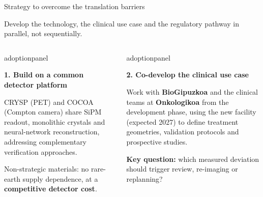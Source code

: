 \documentclass[aspectratio=169,11pt]{beamer}
\newcommand{\hi}[1]{\textcolor{crRed}{#1}}
\begin{document}
\begin{frame}{Strategy to overcome the translation barriers}

{\small Develop the technology, the clinical use case and the regulatory pathway \hi{in parallel}, not sequentially.\par}
\vspace{0.16cm}
\begin{columns}[T,onlytextwidth]
\begin{beamercolorbox}[sep=6pt,wd=\linewidth]{adoptionpanel}
\begin{minipage}[t][2.3cm][t]{\linewidth}\raggedright
{\footnotesize\bfseries\color{crBlue}1. Build on a common detector platform\par}
\vspace{0.07cm}
{\scriptsize CRYSP (PET) and COCOA (Compton camera) share SiPM readout, monolithic crystals and neural-network reconstruction, addressing complementary verification approaches.\par\vspace{0.06cm}
Non-strategic materials: no rare-earth supply dependence, at a \textbf{competitive detector cost}.\par}
\end{minipage}
\end{beamercolorbox}
\begin{beamercolorbox}[sep=6pt,wd=\linewidth]{adoptionpanel}
\begin{minipage}[t][2.3cm][t]{\linewidth}\raggedright
{\footnotesize\bfseries\color{crBlue}2. Co-develop the clinical use case\par}
\vspace{0.07cm}
{\scriptsize Work with \textbf{BioGipuzkoa} and the clinical teams at \textbf{Onkologikoa} from the development phase, using the new facility (expected 2027) to define treatment geometries, validation protocols and prospective studies.\par\vspace{0.06cm}
\textbf{Key question:} which measured deviation should trigger review, re-imaging or replanning?\par}
\end{minipage}
\end{beamercolorbox}
\end{columns}
\par\vspace{0.20cm}
\begin{columns}[T,onlytextwidth]

\end{columns}
\end{frame}
\end{document}
